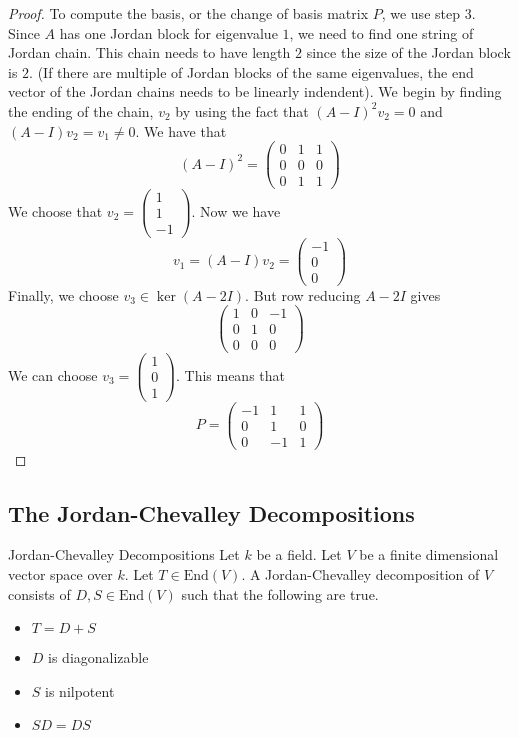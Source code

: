 \documentclass[a4paper]{article}
\begin{document}
\begin{eg}{}{}
\begin{proof}
To compute the basis, or the change of basis matrix $P$, we use step $3$. Since $A$ has one Jordan block for eigenvalue $1$, we need to find one string of Jordan chain. This chain needs to have length $2$ since the size of the Jordan block is $2$. (If there are multiple of Jordan blocks of the same eigenvalues, the end vector of the Jordan chains needs to be linearly indendent). We begin by finding the ending of the chain, $v_2$ by using the fact that $(A-I)^2v_2=0$ and $(A-I)v_2=v_1\neq 0$. We have that $$(A-I)^2=\begin{pmatrix}
0 & 1 & 1\\
0 & 0 & 0\\
0 & 1 & 1
\end{pmatrix}$$
We choose that $v_2=\begin{pmatrix}1\\ 1\\ -1\end{pmatrix}$. Now we have $$v_1=(A-I)v_2=\begin{pmatrix}-1\\ 0\\ 0 \end{pmatrix}$$ Finally, we choose $v_3\in\ker(A-2I)$. But row reducing $A-2I$ gives $$\begin{pmatrix}
1 & 0 & -1\\
0 & 1 & 0\\
0 & 0 & 0
\end{pmatrix}$$
We can choose $v_3=\begin{pmatrix}1\\ 0\\ 1\end{pmatrix}$. This means that $$P=\begin{pmatrix}
-1 & 1 & 1\\
0 & 1 & 0\\
0 & -1 & 1
\end{pmatrix}$$
\end{proof}
\end{eg}

\subsection{The Jordan-Chevalley Decompositions}
\begin{defn}{Jordan-Chevalley Decompositions}{} Let $k$ be a field. Let $V$ be a finite dimensional vector space over $k$. Let $T\in\text{End}(V)$. A Jordan-Chevalley decomposition of $V$ consists of $D,S\in\text{End}(V)$ such that the following are true. 
\begin{itemize}
\item $T=D+S$
\item $D$ is diagonalizable
\item $S$ is nilpotent
\item $SD=DS$
\end{itemize}
\end{defn}
\end{document}
